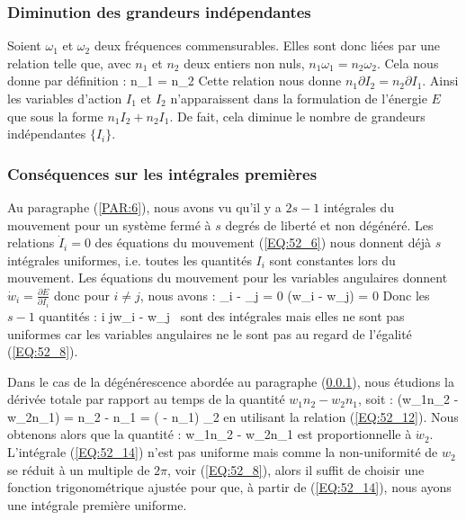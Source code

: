 \subsubsection{Diminution des grandeurs ind\'{e}pendantes}\label{PAR:52_2_1}

Soient $\omega_{1}$ et $\omega_{2}$ deux fr\'{e}quences commensurables. Elles sont donc li\'{e}es par une relation telle que, avec $n_{1}$ et $n_{2}$ deux entiers non nuls, $n_{1}\omega_{1} = n_{2}\omega_{2}$. Cela nous donne par d\'{e}finition :
\be
	n_{1} = n_{2} \label{EQ:52_12}
\ee
Cette relation nous donne $n_{1}\partial I_{2} = n_{2}\partial I_{1}$. Ainsi les variables d'action $I_{1}$ et $I_{2}$ n'apparaissent dans la formulation de l'\'{e}nergie $E$ que sous la forme $n_{1}I_{2} + n_{2}I_{1}$. De fait, cela diminue le nombre de grandeurs ind\'{e}pendantes $\{I_{i}\}$.

\subsubsection{Cons\'{e}quences sur les int\'{e}grales premi\`{e}res}\label{PAR:52_2_2}

Au paragraphe (\ref{PAR:6}), nous avons vu qu'il y a $2s-1$ int\'{e}grales du mouvement pour un syst\`{e}me ferm\'{e} \`{a} $s$ degr\'{e}s de libert\'{e} et non d\'{e}g\'{e}n\'{e}r\'{e}. Les relations $\dot{I}_{i} = 0$ des \'{e}quations du mouvement (\ref{EQ:52_6}) nous donnent d\'{e}j\`{a} $s$ int\'{e}grales uniformes, i.e. toutes les quantit\'{e}s $I_{i}$ sont constantes lors du mouvement. Les \'{e}quations du mouvement pour les variables angulaires donnent $\dot{w}_{i} = \frac{\partial E}{\partial I_{i}}$ donc pour $i \ne j$, nous avons :
\benn
	_{i} - _{j} = 0 \Leftrightarrow {}\left(w_{i} - w_{j}\right) = 0
\eenn
Donc les $s - 1$ quantit\'{e}s :
\be
	\forall i \ne j\text{, }w_{i} - w_{j} \label{EQ:52_13}
\ee
sont des int\'{e}grales mais elles ne sont pas uniformes car les variables angulaires ne le sont pas au regard de l'\'{e}galit\'{e} (\ref{EQ:52_8}).

Dans le cas de la d\'{e}g\'{e}n\'{e}rescence abord\'{e}e au paragraphe (\ref{PAR:52_2_1}), nous \'{e}tudions la d\'{e}riv\'{e}e totale par rapport au temps de la quantit\'{e} $w_{1}n_{2} - w_{2}n_{1}$, soit :
\benn
	(w_{1}n_{2} - w_{2}n_{1}) = n_{2} - n_{1} = \left( - n_{1}\right) \propto {}_{2}
\eenn
en utilisant la relation (\ref{EQ:52_12}). Nous obtenons alors que la quantit\'{e} :
\be
	w_{1}n_{2} - w_{2}n_{1} \label{EQ:52_14}
\ee
est proportionnelle \`{a} $\dot{w}_{2}$. L'int\'{e}grale (\ref{EQ:52_14}) n'est pas uniforme mais comme la non-uniformit\'{e} de $w_{2}$ se r\'{e}duit \`{a} un multiple de $2\pi$, voir (\ref{EQ:52_8}), alors il suffit de choisir une fonction trigonom\'{e}trique ajust\'{e}e pour que, \`{a} partir de (\ref{EQ:52_14}), nous ayons une int\'{e}grale premi\`{e}re uniforme.
